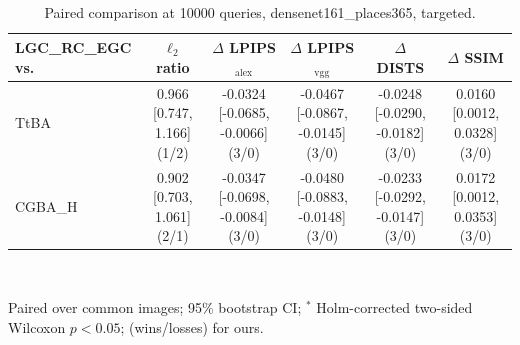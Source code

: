 \begin{table}[t]
\centering\footnotesize
\caption{Paired comparison at 10000 queries, densenet161\_places365, targeted.}
\begin{tabular}{lccccc}
\toprule
LGC\_RC\_EGC vs. & $\ell_2$ ratio & $\Delta$ LPIPS$_{\mathrm{alex}}$ & $\Delta$ LPIPS$_{\mathrm{vgg}}$ & $\Delta$ DISTS & $\Delta$ SSIM \\
\midrule
TtBA & 0.966 [0.747, 1.166] (1/2) & -0.0324 [-0.0685, -0.0066] (3/0) & -0.0467 [-0.0867, -0.0145] (3/0) & -0.0248 [-0.0290, -0.0182] (3/0) & 0.0160 [0.0012, 0.0328] (3/0) \\
CGBA\_H & 0.902 [0.703, 1.061] (2/1) & -0.0347 [-0.0698, -0.0084] (3/0) & -0.0480 [-0.0883, -0.0148] (3/0) & -0.0233 [-0.0292, -0.0147] (3/0) & 0.0172 [0.0012, 0.0353] (3/0) \\
\bottomrule
\end{tabular}
\\[2pt]\parbox{\linewidth}{\scriptsize Paired over common images; 95\% bootstrap CI; $^{*}$ Holm-corrected two-sided Wilcoxon $p<0.05$; (wins/losses) for ours.}
\end{table}
